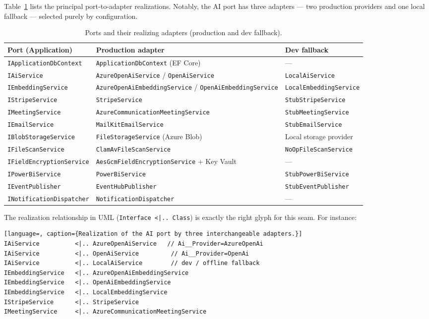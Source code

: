 \documentclass[11pt,a4paper]{article}
\begin{document}
Table~\ref{tab:adapters} lists the principal port-to-adapter realizations.
Notably, the AI port has three adapters --- two production providers and one
local fallback --- selected purely by configuration.

\begin{table}[H]\centering
\caption{Ports and their realizing adapters (production and dev fallback).}
\label{tab:adapters}
\small
\begin{tabular}{@{}l l l@{}}
\toprule
\textbf{Port (Application)} & \textbf{Production adapter} & \textbf{Dev fallback} \\
\midrule
\texttt{IApplicationDbContext} & \texttt{ApplicationDbContext} (EF Core) & --- \\
\texttt{IAiService} & \texttt{AzureOpenAiService} / \texttt{OpenAiService} & \texttt{LocalAiService} \\
\texttt{IEmbeddingService} & \texttt{AzureOpenAiEmbeddingService} / \texttt{OpenAiEmbeddingService} & \texttt{LocalEmbeddingService} \\
\texttt{IStripeService} & \texttt{StripeService} & \texttt{StubStripeService} \\
\texttt{IMeetingService} & \texttt{AzureCommunicationMeetingService} & \texttt{StubMeetingService} \\
\texttt{IEmailService} & \texttt{MailKitEmailService} & \texttt{StubEmailService} \\
\texttt{IBlobStorageService} & \texttt{FileStorageService} (Azure Blob) & Local storage provider \\
\texttt{IFileScanService} & \texttt{ClamAvFileScanService} & \texttt{NoOpFileScanService} \\
\texttt{IFieldEncryptionService} & \texttt{AesGcmFieldEncryptionService} + Key Vault & --- \\
\texttt{IPowerBiService} & \texttt{PowerBiService} & \texttt{StubPowerBiService} \\
\texttt{IEventPublisher} & \texttt{EventHubPublisher} & \texttt{StubEventPublisher} \\
\texttt{INotificationDispatcher} & \texttt{NotificationDispatcher} & --- \\
\bottomrule
\end{tabular}
\end{table}

The realization relationship in UML (\texttt{Interface <|.. Class}) is exactly
the right glyph for this seam. For instance:

\begin{lstlisting}[language=, caption={Realization of the AI port by three interchangeable adapters.}]
IAiService          <|.. AzureOpenAiService   // Ai__Provider=AzureOpenAi
IAiService          <|.. OpenAiService         // Ai__Provider=OpenAi
IAiService          <|.. LocalAiService        // dev / offline fallback
IEmbeddingService   <|.. AzureOpenAiEmbeddingService
IEmbeddingService   <|.. OpenAiEmbeddingService
IEmbeddingService   <|.. LocalEmbeddingService
IStripeService      <|.. StripeService
IMeetingService     <|.. AzureCommunicationMeetingService
\end{lstlisting}
\end{document}
